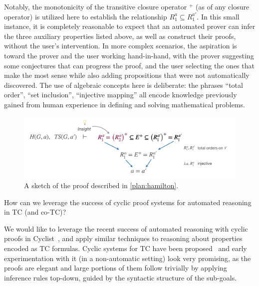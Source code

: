 \begin{example}
Notably, the monotonicity of the transitive closure operator $^+$ (as of any closure operator) is utilized here to establish the relationship $R_1^a \subseteq R_1^{a'}$.
In this small instance, it is completely reasonable to expect that an automated prover can infer the three auxiliary properties listed above, as well as construct their proofs, without the user's intervention.
In more complex scenarios, the aspiration is toward the prover and the user working hand-in-hand, with the prover suggesting some conjectures that can progress the proof, and the user selecting the ones that make the most sense while also adding propositions that were not automatically discovered.
The use of algebraic concepts here is deliberate: the phrases ``total order'', ``set inclusion'', ``injective mapping'' all encode knowledge previously gained from human experience in defining and solving mathematical problems.
\end{example}


\begin{figure}
\begin{center}
\includegraphics[width=.8\textwidth]{img/topological-and-hamilton-proof-sketch.png}
\end{center}
\vspace{-2em}
\caption{A sketch of the proof described in \autoref{plan:hamilton}.}
\label{plan:hamilton-proof}
\end{figure}


\begin{researchquestion}How can we leverage the success of cyclic proof systems for automated reasoning in TC (and co-TC)?
\end{researchquestion}

We would like to leverage the recent success of automated reasoning with cyclic proofs in Cyclist~\cite{cyclist}, and apply similar techniques to reasoning about properties encoded as TC formulas.
Cyclic systems for TC have been proposed~\cite{TOCL2020:Cohen,IJCAR2020:Cohen} and early experimentation with it (in a non-automatic setting) look very promising, as the proofs are elegant and large portions of them follow trivially by applying inference rules top-down, guided by the syntactic structure of the sub-goals.

